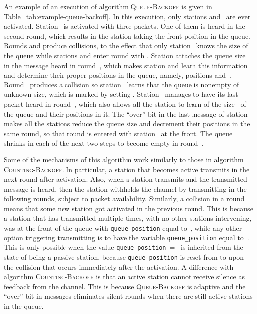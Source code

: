 \documentclass[11pt]{article}
\begin{document}
An example of an execution of algorithm \textsc{Queue-Backoff} is given in Table~\ref{tab:example-queue-backoff}.
In this execution, only stations  and~ are ever activated.
Station~ is activated with three packets.
One of them is heard in the second round, which results in the station taking the front position in the queue.
Rounds  and  produce collisions, to the effect that only station~ knows the size of the queue while stations  and  enter round  with .
Station  attaches the queue size~ in the message heard in round~, which makes station  and  learn this information and determine their proper positions in the queue, namely, positions  and~.
Round~ produces a collision so station~ learns that the queue is nonempty of unknown size, which is marked by setting .
Station~ manages to have its last packet heard in round~, which also allows all the station to learn of the size~ of the queue and their positions in it.
The ``over'' bit in the last message of station~ makes all the stations reduce the queue size and decrement their positions in the same round, so that round  is entered with station~ at the front.
The queue shrinks in each of the next two steps to become empty in round~.

Some of the mechanisms of this algorithm work similarly to those in algorithm \textsc{Counting-Backoff}.
In particular, a station that becomes active transmits in the next round after activation. 
Also, when a station transmits and the transmitted message is heard, then the station withholds the channel by transmitting in the following rounds, subject to packet availability. 
Similarly, a collision in a round means that some new station got activated in the previous round. 
This is because a station that has transmitted multiple times, with no other stations intervening, was at the front of the queue with \texttt{queue\_position} equal to~, while any other option triggering transmitting is to have the variable \texttt{queue\_position}  equal to~.
This is only possible when the value \texttt{queue\_position}~=~ is inherited from the state of being a passive station, because \texttt{queue\_position} is reset from  to  upon the collision that occurs immediately after the activation.
A difference with algorithm \textsc{Counting-Backoff} is that an active station cannot receive silence as feedback from the channel.
This is because \textsc{Queue-Backoff} is adaptive and the ``over'' bit in messages eliminates silent rounds when there are still active stations in the queue.
\end{document}
